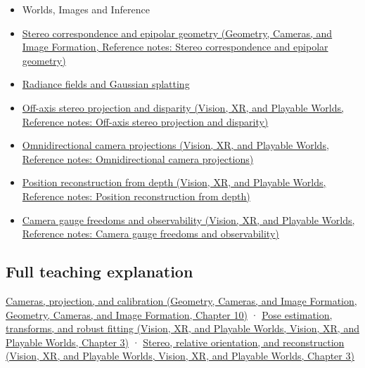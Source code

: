 \begin{itemize}
\item
  {Worlds, Images and Inference}
\item
  \href{../03-Geometry-Cameras-and-Image-Formation/main.pdf\#nameddest=appendix-c4e98b6e4001}{Stereo correspondence and epipolar geometry (Geometry, Cameras, and Image Formation, Reference notes: Stereo correspondence and epipolar geometry)}
\item
  \hyperref[appendix-c5b332e400e7]{Radiance fields and Gaussian splatting}
\item
  \href{../07-Vision-XR-and-Playable-Worlds/main.pdf\#nameddest=appendix-0976e86e5b9f}{Off-axis stereo projection and disparity (Vision, XR, and Playable Worlds, Reference notes: Off-axis stereo projection and disparity)}
\item
  \href{../07-Vision-XR-and-Playable-Worlds/main.pdf\#nameddest=appendix-fc99ad39f351}{Omnidirectional camera projections (Vision, XR, and Playable Worlds, Reference notes: Omnidirectional camera projections)}
\item
  \href{../07-Vision-XR-and-Playable-Worlds/main.pdf\#nameddest=appendix-2cbf2968e866}{Position reconstruction from depth (Vision, XR, and Playable Worlds, Reference notes: Position reconstruction from depth)}
\item
  \href{../07-Vision-XR-and-Playable-Worlds/main.pdf\#nameddest=appendix-113f0267e5f4}{Camera gauge freedoms and observability (Vision, XR, and Playable Worlds, Reference notes: Camera gauge freedoms and observability)}
\end{itemize}

\subsection{Full teaching explanation}\label{appendix-3ee9861904d5-full-teaching-explanation}

\href{../03-Geometry-Cameras-and-Image-Formation/main.pdf\#nameddest=03-visual-computing-i-ch003-cameras-projection-and-calibration}{Cameras, projection, and calibration (Geometry, Cameras, and Image Formation, Geometry, Cameras, and Image Formation, Chapter 10)} · \href{../07-Vision-XR-and-Playable-Worlds/main.pdf\#nameddest=04-visual-computing-ii-ch032-pose-estimation-transforms-and-robust-fitting}{Pose estimation, transforms, and robust fitting (Vision, XR, and Playable Worlds, Vision, XR, and Playable Worlds, Chapter 3)} · \href{../07-Vision-XR-and-Playable-Worlds/main.pdf\#nameddest=04-visual-computing-ii-ch032-stereo-relative-orientation-and-reconstruction}{Stereo, relative orientation, and reconstruction (Vision, XR, and Playable Worlds, Vision, XR, and Playable Worlds, Chapter 3)}

